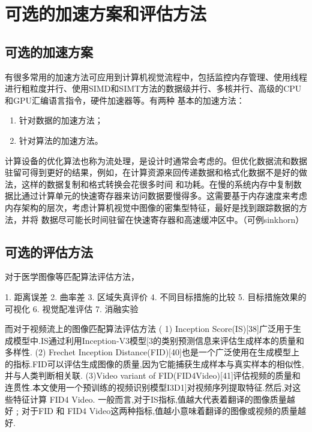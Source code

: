 
\section{可选的加速方案和评估方法}

\subsection{可选的加速方案}

有很多常用的加速方法可应用到计算机视觉流程中，包括监控内存管理、使用线程进行粗粒度并行、使用SIMD和SIMT方法的数据级并行、多核并行、高级的CPU和GPU汇编语言指令，硬件加速器等。有两种
基本的加速方法：
\begin{enumerate}
    \item 针对数据的加速方法；
    \item 针对算法的加速方法。
\end{enumerate}

计算设备的优化算法也称为流处理，是设计时通常会考虑的。但优化数据流和数据驻留可得到更好的结果，例如，在计算资源来回传递数据和格式化数据不是好的做法，这样的数据复制和格式转换会花很多时间
和功耗。在慢的系统内存中复制数据比通过计算单元的快速寄存器来访问数据要慢得多。这需要基于内存速度来考虑内存架构的层次，考虑计算机视觉中图像的密集型特征，最好是找到跟踪数据的方法，并将
数据尽可能长时间驻留在快速寄存器和高速缓冲区中。（可例sinkhorn）

\subsection{可选的评估方法}

对于医学图像等匹配算法评估方法，

1. 距离误差
2. 曲率差
3. 区域失真评价
4. 不同目标措施的比较
5. 目标措施效果的可视化
6. 视觉配准评估
7. 消融实验

而对于视频流上的图像匹配算法评估方法
( 1) Inception Score(IS)[38]广泛用于生成模型中.IS通过利用Inception-V3模型[3的类别预测信息来评估生成样本的质量和多样性.
(2) Frechet Inception Distance(FID)[40]也是一个广泛使用在生成模型上的指标.FID可以评估生成图像的质量,因为它能捕获生成样本与真实样本的相似性,并与人类判断相关联.
(3)Video variant of FID(FID4Video)[41]评估视频的质量和连贯性.本文使用一个预训练的视频识别模型I3D1]对视频序列提取特征.然后,对这些特征计算 FID4 Video.
一般而言,对于IS指标,值越大代表着翻译的图像质量越好﹔对于FID 和 FID4 Video这两种指标,值越小意味着翻译的图像或视频的质量越好.


\nocite{*}%